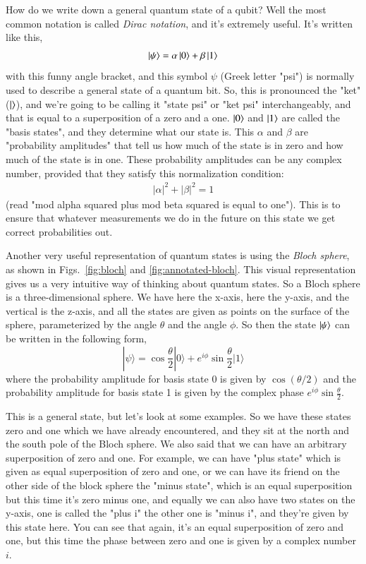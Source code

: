 How do we write down a general quantum state of a qubit? Well the most common notation is called \emph{Dirac notation}, and it's extremely useful. It's written like this,
\begin{align}
\left| \psi \right\rangle = \alpha\left| 0 \right\rangle + \beta\left| 1 \right\rangle
\end{align}
with this funny angle bracket, and this symbol $\psi$ (Greek letter "psi") is normally used to describe a general state of a quantum bit. So, this is pronounced the "ket" ($\left|  \right\rangle$), and we're going to be calling it "state psi" or "ket psi" interchangeably, and that is equal to a superposition of a zero and a one. $\left| 0 \right\rangle$ and $\left| 1 \right\rangle$ are called the "basis states", and they determine what our state is. This $\alpha$ and $\beta$ are "probability amplitudes" that tell us how much of the state is in zero and how much of the state is in one.  These probability amplitudes can be any complex number, provided that they satisfy this normalization condition:
\begin{align}
    |\alpha|^2 + |\beta|^2 = 1
\end{align}
(read "mod alpha squared plus mod beta squared is equal to one"). This is to ensure that whatever measurements we do in the future on this state we get correct probabilities out.

Another very useful representation of quantum states is using the \emph{Bloch sphere}, as shown in Figs.~\ref{fig:bloch} and \ref{fig:annotated-bloch}. This visual representation gives us a very intuitive way of thinking about quantum states. So a Bloch sphere is a three-dimensional sphere. We have here the x-axis, here the y-axis, and the vertical is the z-axis, and all the states are given as points on the surface of the sphere, parameterized by the angle $\theta$ and the angle $\phi$. So then the state $\left| \psi \right\rangle$ can be written in the following form,
\begin{equation}
|\psi\rangle=\cos \frac{\theta}{2}|0\rangle+e^{i \phi} \sin \frac{\theta}{2}|1\rangle
\end{equation}
where the probability amplitude for basis state 0 is given by $\cos(\theta/2)$ and the probability amplitude for basis state 1 is given by the complex phase $e^{i \phi} \sin \frac{\theta}{2}$. 

This is a general state, but let's look at some examples. So we have these states zero and one which we have already encountered, and they sit at the north and the south pole of the Bloch sphere. We also said that we can have an arbitrary superposition of zero and one. For example, we can have "plus state" which is given as equal superposition of zero and one, or we can have its friend on the other side of the block sphere the "minus state", which is an equal superposition but this time it's zero minus one, and equally we can also have two states on the y-axis, one is called the "plus i" the other one is "minus i", and they're given by this state here. You can see that again, it's an equal superposition of zero and one, but this time the phase between zero and one is given by a complex number $i$.

